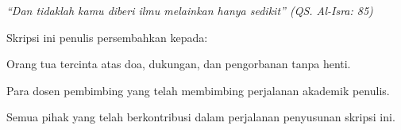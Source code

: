 
\vspace{7cm}
\begin{center}
	\textit{``Dan tidaklah kamu diberi ilmu melainkan hanya sedikit'' (QS. Al-Isra: 85)}
\end{center}

\vspace{0.5cm}
\begin{center}
	Skripsi ini penulis persembahkan kepada:
	
	Orang tua tercinta atas doa, dukungan, dan pengorbanan tanpa henti.
	
	Para dosen pembimbing yang telah membimbing perjalanan akademik penulis.
	
	Semua pihak yang telah berkontribusi dalam perjalanan penyusunan skripsi ini.
		
\end{center}

